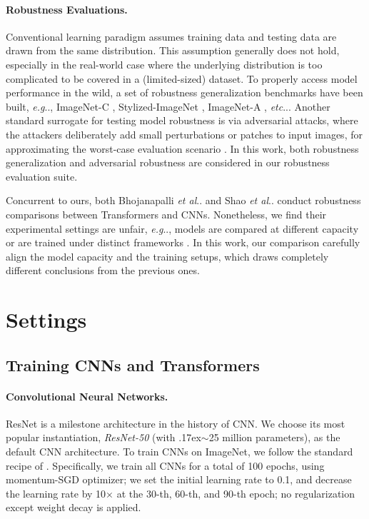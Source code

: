 \documentclass{article}
\makeatletter
\def\vs{{\bm{s}}}
\newcommand{\app}{\raise.17ex\hbox{$\scriptstyle\sim$}}
\DeclareRobustCommand\onedot{\futurelet\@let@token\@onedot}
\def\@onedot{\ifx\@let@token.\else.\null\fi\xspace}
\def\eg{\emph{e.g}\onedot} \def\Eg{\emph{E.g}\onedot}
\def\etc{\emph{etc}\onedot} \def\vs{\emph{vs}\onedot}
\def\etal{\emph{et al}\onedot}
\makeatother
\begin{document}
\paragraph{Robustness Evaluations.}
Conventional learning paradigm assumes training data and testing data are drawn from the same distribution. This assumption generally does not hold, especially in the real-world case where the underlying distribution is too complicated to be covered in a (limited-sized) dataset. To properly access model performance in the wild, a set of robustness generalization benchmarks have been built, \eg, ImageNet-C \cite{Hendrycks2018},  Stylized-ImageNet \cite{Geirhos2018}, ImageNet-A \cite{hendrycks2021nae}, \etc. Another standard surrogate for testing model robustness is via adversarial attacks, where the attackers deliberately add small perturbations or patches to input images, for approximating the worst-case evaluation scenario \cite{Szegedy2014,Goodfellow2015}. In this work, both robustness generalization and adversarial robustness are considered in our robustness evaluation suite.

Concurrent to ours, both Bhojanapalli \etal \cite{bhojanapalli2021understanding} and Shao \etal \cite{shao2021adversarial} conduct robustness comparisons between Transformers and CNNs. Nonetheless, we find their experimental settings are unfair, \eg, models are compared at different capacity \cite{bhojanapalli2021understanding,shao2021adversarial} or are trained under distinct frameworks \cite{shao2021adversarial}. In this work, our comparison carefully align the model capacity and the training setups, which draws completely different conclusions from the previous ones.



\section{Settings}
\label{Sec:settings}
\subsection{Training CNNs and Transformers}
\label{sec:settings:vit}
\paragraph{Convolutional Neural Networks.}
ResNet \cite{He2016} is a milestone architecture in the history of CNN. We choose its most popular instantiation, \emph{ResNet-50} (with \app25 million parameters), as the default CNN architecture. To train CNNs on ImageNet, we follow the standard recipe of \cite{goyal2017accurate,radosavovic2020designing}. Specifically, we train all CNNs for a total of 100 epochs, using momentum-SGD optimizer; we set the initial learning rate to 0.1, and decrease the learning rate by 10$\times$ at the 30-th, 60-th, and 90-th epoch; no regularization except weight decay is applied.
\end{document}
